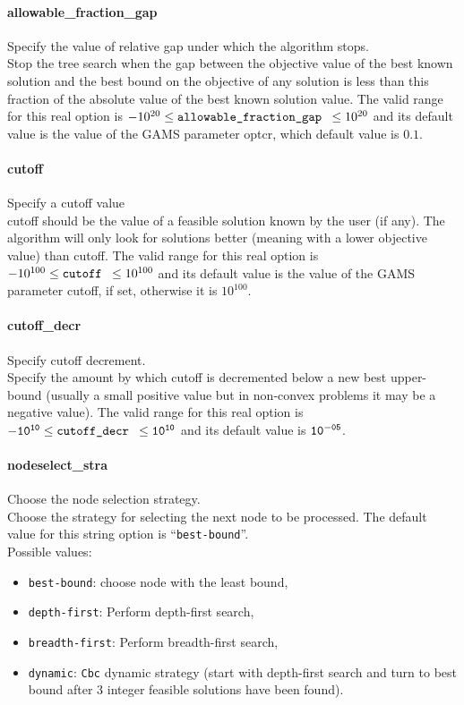 \paragraph{allowable\_fraction\_gap}
Specify the value of relative gap under which the algorithm stops.\\
 Stop the tree search when the gap between the
objective value of the best known solution and
the best bound on the objective of any solution
is less than this fraction of the absolute value
of the best known solution value. The valid range for this real option is
$-10^{20} \le \hbox{\tt allowable\_fraction\_gap } \le 10^{20}$
and its default value is the value of the GAMS parameter optcr, which default value is $0.1$.

\paragraph{cutoff}Specify a cutoff value\\
cutoff should be the value of a feasible solution known by the user (if any).
The algorithm will only look for solutions better (meaning with a lower objective value) than cutoff. The valid range for this real option is $-10^{100} \le \hbox{\tt cutoff } \le 10^{100}$ and its default value is the value of the GAMS parameter cutoff, if set, otherwise it is $10^{100}$.

\paragraph{cutoff\_decr} Specify cutoff decrement.\\
Specify the amount by which cutoff is decremented
below a new best upper-bound (usually a small
positive value but in non-convex problems it may
be a negative value). The valid range for this real option is
${\tt -10^{10}} \le \hbox{\tt cutoff\_decr } \le {\tt 10^{10}}$
and its default value is ${\tt 10^{-05}}$.


\paragraph{nodeselect\_stra} Choose the node selection strategy.\\
 Choose the strategy for selecting the next node to be processed.
The default value for this string option is ``{\tt best-bound}''. \\
Possible values:
\begin{itemize}
   \item {\tt best-bound}: choose node with the least bound,
   \item {\tt depth-first}: Perform depth-first search,
   \item {\tt breadth-first}: Perform breadth-first search,
   \item {\tt dynamic}: {\tt Cbc} dynamic strategy (start with depth-first
search and turn to best bound after 3 integer
feasible solutions have been found).
\end{itemize}


